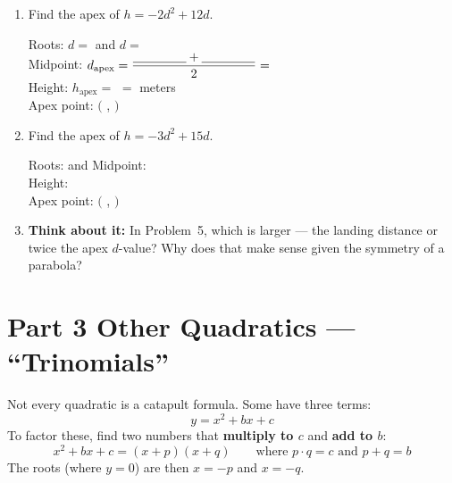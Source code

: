 \documentclass[12pt]{article}
\newcommand{\blank}[1][4cm]{\underline{\hspace{#1}}}
\begin{document}
\begin{enumerate}[leftmargin=*, label=\textbf{\arabic*.}, resume]

\item Find the apex of $h = -2d^2 + 12d$.

  \begin{workbox}
  Roots: $d = $ \blank[2cm] and $d = $ \blank[2cm] \\[10pt]
  Midpoint: $d_{\text{apex}} = \dfrac{\blank[1.5cm] + \blank[1.5cm]}{2}
  = $ \blank[1.5cm] \\[10pt]
  Height: $h_{\text{apex}} = $ \blank[6cm] $= $ \blank[1.5cm] meters\\[10pt]
  Apex point: $\bigl($ \blank[1cm] , \blank[1cm] $\bigr)$
  \end{workbox}

\vspace{8pt}
\item Find the apex of $h = -3d^2 + 15d$.

  \begin{workbox}
  Roots: \blank[2cm] and \blank[2cm] \quad
  Midpoint: \blank[2cm] \\[10pt]
  Height: \blank[8cm] \\[10pt]
  Apex point: $\bigl($ \blank[1cm] , \blank[1cm] $\bigr)$
  \end{workbox}

\vspace{8pt}
\item \textbf{Think about it:} In Problem~5, which is larger --- the landing
  distance or twice the apex $d$-value?  Why does that make sense given the
  symmetry of a parabola?

  \begin{workbox}
  \vspace{2cm}
  \end{workbox}

\end{enumerate}

\section*{Part 3 \quad Other Quadratics --- ``Trinomials''}

\begin{conceptbox}
Not every quadratic is a catapult formula.  Some have three terms:
\[
  y = x^2 + bx + c
\]
To factor these, find two numbers that \textbf{multiply to $c$} and
\textbf{add to $b$}:
\[
  x^2 + bx + c = (x + p)(x + q)
  \qquad \text{where } p \cdot q = c \text{ and } p + q = b
\]
The roots (where $y = 0$) are then $x = -p$ and $x = -q$.
\end{conceptbox}
\end{document}
